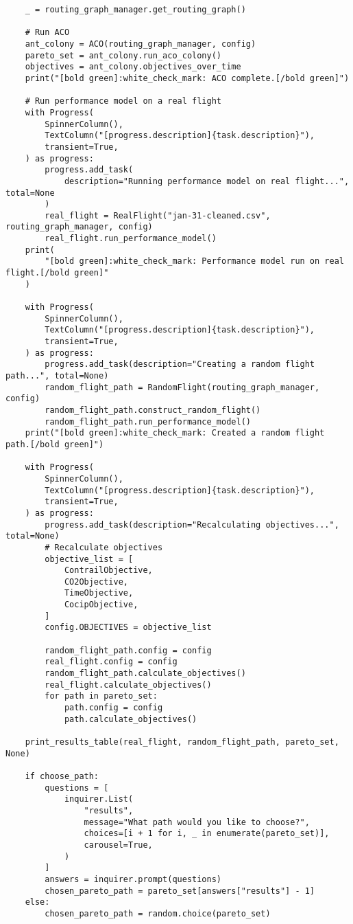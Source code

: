 \begin{verbatim}
    _ = routing_graph_manager.get_routing_graph()

    # Run ACO
    ant_colony = ACO(routing_graph_manager, config)
    pareto_set = ant_colony.run_aco_colony()
    objectives = ant_colony.objectives_over_time
    print("[bold green]:white_check_mark: ACO complete.[/bold green]")

    # Run performance model on a real flight
    with Progress(
        SpinnerColumn(),
        TextColumn("[progress.description]{task.description}"),
        transient=True,
    ) as progress:
        progress.add_task(
            description="Running performance model on real flight...", total=None
        )
        real_flight = RealFlight("jan-31-cleaned.csv", routing_graph_manager, config)
        real_flight.run_performance_model()
    print(
        "[bold green]:white_check_mark: Performance model run on real flight.[/bold green]"
    )

    with Progress(
        SpinnerColumn(),
        TextColumn("[progress.description]{task.description}"),
        transient=True,
    ) as progress:
        progress.add_task(description="Creating a random flight path...", total=None)
        random_flight_path = RandomFlight(routing_graph_manager, config)
        random_flight_path.construct_random_flight()
        random_flight_path.run_performance_model()
    print("[bold green]:white_check_mark: Created a random flight path.[/bold green]")

    with Progress(
        SpinnerColumn(),
        TextColumn("[progress.description]{task.description}"),
        transient=True,
    ) as progress:
        progress.add_task(description="Recalculating objectives...", total=None)
        # Recalculate objectives
        objective_list = [
            ContrailObjective,
            CO2Objective,
            TimeObjective,
            CocipObjective,
        ]
        config.OBJECTIVES = objective_list

        random_flight_path.config = config
        real_flight.config = config
        random_flight_path.calculate_objectives()
        real_flight.calculate_objectives()
        for path in pareto_set:
            path.config = config
            path.calculate_objectives()

    print_results_table(real_flight, random_flight_path, pareto_set, None)

    if choose_path:
        questions = [
            inquirer.List(
                "results",
                message="What path would you like to choose?",
                choices=[i + 1 for i, _ in enumerate(pareto_set)],
                carousel=True,
            )
        ]
        answers = inquirer.prompt(questions)
        chosen_pareto_path = pareto_set[answers["results"] - 1]
    else:
        chosen_pareto_path = random.choice(pareto_set)


\end{verbatim}
